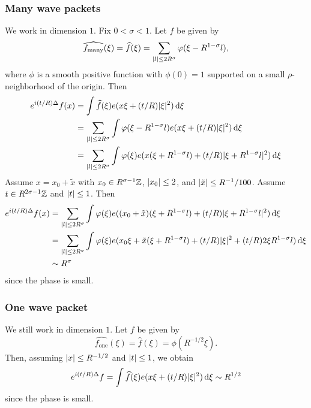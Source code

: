 \subsubsection{Many wave packets}
We work in dimension $1$.
Fix $0<\sigma<1$.
Let $f$ be given by
\[
\widehat{f_{\mathrm{many}}}(\xi)
=
\widehat{f}(\xi)
=
\sum_{\lvert l\rvert \leq 2R^{\sigma}} \varphi(\xi-R^{1-\sigma}l),
\]
where $\phi$ is a smooth positive function with $\phi(0)=1$ supported on a small $\rho$-neighborhood of the origin.
Then
\begin{align*}
e^{i(t/R)\Delta} f(x)
&=
\int \widehat{f}(\xi) e(x \xi + (t/R) \lvert\xi\rvert^{2}) \mathop{}\!\mathrm{d}\xi
\\ &=
\sum_{\lvert l\rvert \leq 2R^{\sigma}} \int \varphi(\xi-R^{1-\sigma}l) e(x \xi + (t/R) \lvert\xi\rvert^{2}) \mathop{}\!\mathrm{d}\xi
\\ &=
\sum_{\lvert l\rvert \leq 2R^{\sigma}} \int \varphi(\xi) e(x (\xi+R^{1-\sigma}l) + (t/R) \lvert\xi+R^{1-\sigma}l\rvert^{2}) \mathop{}\!\mathrm{d}\xi
\end{align*}
Assume $x=x_{0}+\tilde{x}$ with $x_{0}\in R^{\sigma-1}\mathbb{Z}$, $\lvert x_{0}\rvert \leq 2$, and $\lvert\tilde{x}\rvert \leq R^{-1}/100$.
Assume $t \in R^{2\sigma-1}\mathbb{Z}$ and $\lvert t\rvert \leq 1$.
Then
\begin{align*}
e^{i(t/R)\Delta} f(x)
&=
\sum_{\lvert l\rvert \leq 2R^{\sigma}} \int \varphi(\xi) e((x_{0}+\tilde{x}) (\xi+R^{1-\sigma}l) + (t/R) \lvert\xi+R^{1-\sigma}l\rvert^{2}) \mathop{}\!\mathrm{d}\xi
\\ &=
\sum_{\lvert l\rvert \leq 2R^{\sigma}} \int \varphi(\xi) e(x_{0}\xi + \tilde{x}(\xi+R^{1-\sigma}l) + (t/R) \lvert\xi\rvert^{2} + (t/R) 2\xi R^{1-\sigma}l) \mathop{}\!\mathrm{d}\xi
\\ &\sim
R^{\sigma}
\end{align*}
since the phase is small.

\subsubsection{One wave packet}
We still work in dimension $1$.
Let $f$ be given by
\[
\widehat{f_{\mathrm{one}}}(\xi)
=
\widehat{f}(\xi)
=
\phi(R^{-1/2}\xi).
\]
Then, assuming $\lvert x\rvert \leq R^{-1/2}$ and $\lvert t\rvert \leq 1$, we obtain
\[
e^{i (t/R) \Delta} f
=
\int \widehat{f}(\xi) e(x \xi + (t/R) \lvert\xi\rvert^{2}) \mathop{}\!\mathrm{d}\xi
\sim
R^{1/2}
\]
since the phase is small.

